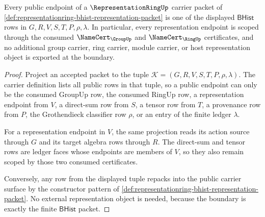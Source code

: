 \begin{theorem}
\label{thm:representationring-carrier-bhist-boundary}
Every public endpoint of a $\RepresentationRingUp$ carrier packet of
\autoref{def:representationring-bhist-representation-packet} is one of the
displayed $\mathsf{BHist}$ rows in
$G,R,V,S,T,P,\rho,\lambda$. In particular, every representation endpoint is
scoped through the consumed $\NameCert_{\GroupUp}$ and
$\NameCert_{\RingUp}$ certificates, and no additional group carrier, ring
carrier, module carrier, or host representation object is exported at the
boundary.
\end{theorem}
\begin{proof}
Project an accepted packet to the tuple
$\mathcal{K}=(G,R,V,S,T,P,\rho,\lambda)$. The carrier definition lists all
public rows in that tuple, so a public endpoint can only be the consumed
GroupUp row, the consumed RingUp row, a representation endpoint from $V$, a
direct-sum row from $S$, a tensor row from $T$, a provenance row from $P$, the
Grothendieck classifier row $\rho$, or an entry of the finite ledger
$\lambda$.

For a representation endpoint in $V$, the same projection reads its action
source through $G$ and its target algebra rows through $R$. The direct-sum
and tensor rows are ledger faces whose endpoints are members of $V$, so they
also remain scoped by those two consumed certificates.

Conversely, any row from the displayed tuple repacks into the public carrier
surface by the constructor pattern of
\autoref{def:representationring-bhist-representation-packet}. No external
representation object is needed, because the boundary is exactly the
finite $\mathsf{BHist}$ packet.
\end{proof}

